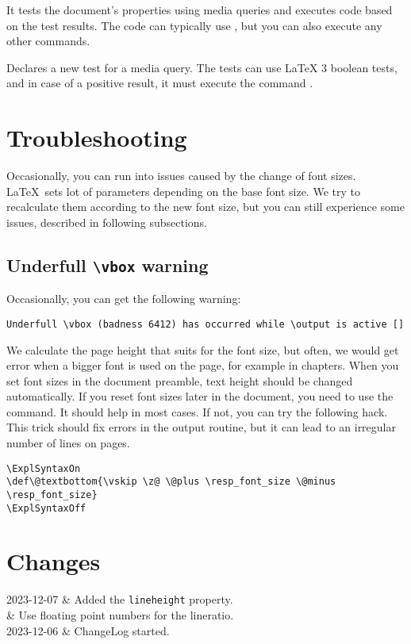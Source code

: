 \documentclass{ltxdoc}
\makeatletter
\newenvironment{changelog}{\longtable{@{} l p{30em}}}{\endlongtable}
\newcommand\change[2]{#1 & #2\\}
\newcommand\StartDescribe[1]{%
  \par\medskip\noindent\DescribeMacro#1
}
\makeatother
\begin{document}
\StartDescribe\mediaquery
\cmd\mediaquery{}

\noindent
It tests the document's properties using media queries and executes code based on the test results.
The code can typically use \cmd\ResponsiveSetup, but you can also execute any other commands.

\StartDescribe\DeclareMediaQueryMatcher
\cmd\DeclareMediaQueryMatcher{}

\noindent Declares a new test for a media query. The tests can use LaTeX 3 boolean tests,
and in case of a positive result, it must execute the command 
\cmd\mediaquerytrue.


\section{Troubleshooting}

Occasionally, you can run into issues caused by the change of font sizes. \LaTeX\ sets lot of parameters 
depending on the base font size. We try to recalculate them according to the new font size, but you can still
experience some issues, described in following subsections.

\subsection{Underfull \texttt{\textbackslash vbox} warning}

Occasionally, you can get the following warning:

\begin{verbatim}
Underfull \vbox (badness 6412) has occurred while \output is active []
\end{verbatim}

We calculate the page height that suits  for the font size, but often,
we would get error when a bigger font is used on the page,
for example in chapters. When you set font sizes in the document preamble,
text height should be changed automatically. If you reset font sizes later in the
document, you need to use the \cmd{\fixtextheight} command. It should help in
most cases. If not, you can try the following hack.
This trick should fix \cmd{\vbox} errors in the output routine, but it can lead 
to an irregular number of lines on pages.


\begin{verbatim}
\ExplSyntaxOn
\def\@textbottom{\vskip \z@ \@plus \resp_font_size \@minus \resp_font_size}
\ExplSyntaxOff
\end{verbatim}

\section{Changes}

\begin{changelog}
  \change{2023-12-07}{Added the \texttt{lineheight} property.}
  \change{}{Use floating point numbers for the lineratio.}
  \change{2023-12-06}{ChangeLog started.}
\end{changelog}

\printbibliography
\end{document}
